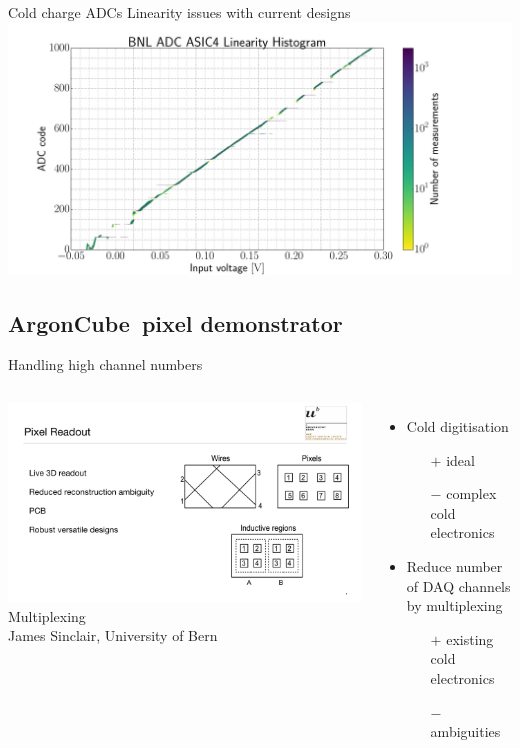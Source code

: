 \documentclass[]{beamer}
\newcommand*{\emphcol}{blue}
\newcommand*{\AC}{{ArgonCube}}
\begin{document}
\begin{frame}{Cold charge ADCs}{\color{\emphcol} Linearity issues with current designs}
	\centering
	\includegraphics[viewport=176 60 1413 829, clip, height=.8\textheight]{bnl/bnl_adc_lin}
\end{frame}

\subsection{\AC\ pixel demonstrator}

\begin{frame}{Handling high channel numbers}
	\begin{columns}[c]
		\centering
		\includegraphics[page=1, viewport=930 90 1850 800, clip, width=\textwidth]{defence/Pixels}\\
		Multiplexing\\
		{\tiny James Sinclair, University of Bern}\\
		\begin{itemize}
			\item Cold digitisation
			\begin{itemize}
				\item[$+$] ideal
				\item[$-$] complex cold electronics
			\end{itemize}
			\item {\color{\emphcol} Reduce number of DAQ channels by multiplexing}
			\begin{itemize}
				\item[$+$] existing cold electronics
				\item[$-$] ambiguities
			\end{itemize}
		\end{itemize}
	\end{columns}
\end{frame}
\end{document}
